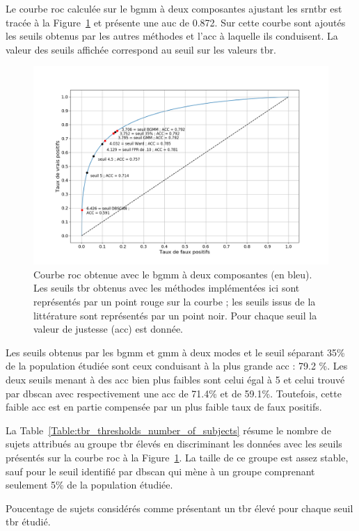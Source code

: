 Le courbe \gls{roc} calculée sur le \gls{bgmm} à deux composantes ajustant les \gls{srntbr} est tracée à la Figure~\ref{Figure:tbr_roc} et 
présente une \gls{auc} de 0.872. Sur cette courbe sont ajoutés les seuils obtenus par les autres méthodes et l'\gls{acc} à laquelle ils conduisent. 
La valeur des seuils affichée correspond au seuil sur les valeurs \gls{tbr}. 

\begin{figure}[h!]
  \centering
	\includegraphics[width=1.0\linewidth]{figures/chapter-4/tbr-roc} 
  \caption[Courbe \gls{roc} obtenue avec le \gls{bgmm} à deux composantes.]{Courbe \gls{roc} obtenue avec le \gls{bgmm} à deux composantes (en bleu). Les seuils \gls{tbr} obtenus avec les méthodes implémentées ici sont représentés 
	par un point rouge sur la courbe ; les seuils issus de la littérature sont représentés par un point noir. Pour chaque seuil la valeur de justesse (\gls{acc}) 
	est donnée.}
  \label{Figure:tbr_roc}
\end{figure}

Les seuils obtenus par les \gls{bgmm} et \gls{gmm} à deux modes et le seuil séparant 35\% de la population étudiée sont ceux conduisant à la plus grande \gls{acc} :
79.2 \%. Les deux seuils menant à des \gls{acc} bien plus faibles sont celui égal à 5 et celui trouvé par \gls{dbscan} avec respectivement une \gls{acc} de 71.4\%
et de 59.1\%. Toutefois, cette faible \gls{acc} est en partie compensée par un plus faible taux de faux positifs.

La Table~\ref{Table:tbr_thresholds_number_of_subjects} résume le nombre de sujets attribués au groupe \gls{tbr} élevés en discriminant les données 
avec les seuils présentés sur la courbe \gls{roc} à la Figure~\ref{Figure:tbr_roc}. La taille de ce groupe est assez stable, sauf pour le seuil identifié 
par \gls{dbscan} qui mène à un groupe comprenant seulement 5\% de la population étudiée.
\begin{table}[h!]
  \centering
  \caption[Poucentage de sujets considérés comme présentant un \gls{tbr} élevé pour chaque seuil \gls{tbr} étudié.]{Poucentage 
	de sujets considérés comme présentant un \gls{tbr} élevé pour chaque seuil \gls{tbr} étudié.}
  
  \label{Table:tbr_thresholds_number_of_subjects}
\end{table}


